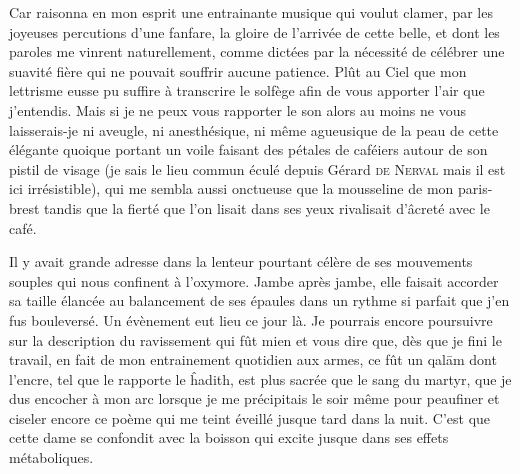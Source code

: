 \begin{prose}
  Car raisonna en mon esprit une entrainante musique qui voulut clamer, par les joyeuses percutions d’une fanfare, la gloire de l’arrivée de cette belle, et dont les paroles me vinrent naturellement, comme dictées par la nécessité de célébrer une suavité fière qui ne pouvait souffrir aucune patience. Plût au Ciel que mon lettrisme eusse pu suffire à transcrire le solfège afin de vous apporter l’air que j’entendis. Mais si je ne peux vous rapporter le son alors au moins ne vous laisserais-je ni aveugle, ni anesthésique, ni même agueusique  de la peau de cette élégante quoique portant un voile faisant des pétales de caféiers autour de son pistil de visage (je sais le lieu commun éculé depuis Gérard \textsc{de Nerval} mais il est ici irrésistible), qui me sembla aussi onctueuse que la mousseline de mon paris-brest tandis que la fierté que l’on lisait dans ses yeux rivalisait d’âcreté avec le café.

  Il y avait grande adresse dans la lenteur pourtant célère de ses mouvements souples qui nous confinent à l’oxymore. Jambe après jambe, elle faisait accorder sa taille élancée au balancement de  ses épaules dans un rythme si parfait que j’en fus bouleversé. Un évènement eut lieu ce jour là. Je pourrais encore poursuivre sur la description du ravissement qui fût mien et vous dire que, dès que je fini le travail, en fait de mon entrainement quotidien aux armes, ce fût un qalām dont l’encre, tel que le rapporte le ĥadith, est plus sacrée que le sang du martyr, que je dus encocher à mon arc lorsque je  me précipitais le soir même pour peaufiner et ciseler encore ce poème qui me teint éveillé jusque tard dans la nuit. C’est que cette dame se confondit avec la boisson qui excite jusque dans ses effets métaboliques.
\end{prose}



